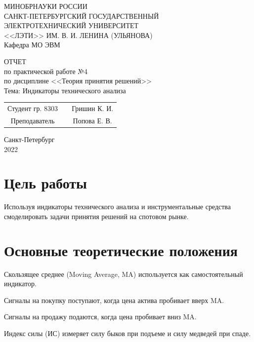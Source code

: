 \documentclass[14pt,a4paper]{extarticle}%
\begin{document}
\begin{titlepage}
  \begin{center}
    МИНОБРНАУКИ РОССИИ\\
    САНКТ-ПЕТЕРБУРГСКИЙ ГОСУДАРСТВЕННЫЙ\\
    ЭЛЕКТРОТЕХНИЧЕСКИЙ УНИВЕРСИТЕТ\\
    <<ЛЭТИ>> ИМ. В. И. ЛЕНИНА (УЛЬЯНОВА)\\
    Кафедра МО ЭВМ

    \vspace{4cm}

    ОТЧЕТ\\
    по практической работе №4\\
    по дисциплине <<Теория принятия решений>>\\
    Тема: Индикаторы технического анализа
    \vfill

    \begin{tabular}{ c c c }
      Студент гр. 8303 & \uline{\hspace{3cm}} & Гришин К. И. \\[1cm]
      Преподаватель    & \uline{\hspace{3cm}} & Попова Е. В. \\
    \end{tabular}
    
    \vfill
    Санкт-Петербург\\
    2022
  \end{center}
\end{titlepage}


\section{Цель работы}
Используя индикаторы технического анализа и инструментальные
средства смоделировать задачи принятия решений на спотовом рынке.

\section{Основные теоретические положения}
Скользящее среднее (Moving Average, MA) используется как
самостоятельный индикатор.

Сигналы на покупку поступают, когда цена актива пробивает вверх MA.

Сигналы на продажу подаются, когда цена пробивает вниз MA.

\vspace{.5cm}

Индекс силы (ИС) измеряет силу быков при подъеме и силу медведей
при спаде.
\end{document}
